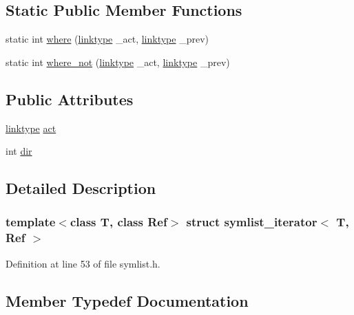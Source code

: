\subsection*{Static Public Member Functions}
\begin{DoxyCompactItemize}
\item 
static int \mbox{\hyperlink{structsymlist__iterator_a260b63ae284e3f07ae510105c7edd6a0}{where}} (\mbox{\hyperlink{structsymlist__iterator_ad9462ba519f8ca01ea64e04e25ee3750}{linktype}} \+\_\+act, \mbox{\hyperlink{structsymlist__iterator_ad9462ba519f8ca01ea64e04e25ee3750}{linktype}} \+\_\+prev)
\item 
static int \mbox{\hyperlink{structsymlist__iterator_abeee238d3bfff557cdbf08a05b632fa8}{where\+\_\+not}} (\mbox{\hyperlink{structsymlist__iterator_ad9462ba519f8ca01ea64e04e25ee3750}{linktype}} \+\_\+act, \mbox{\hyperlink{structsymlist__iterator_ad9462ba519f8ca01ea64e04e25ee3750}{linktype}} \+\_\+prev)
\end{DoxyCompactItemize}
\subsection*{Public Attributes}
\begin{DoxyCompactItemize}
\item 
\mbox{\hyperlink{structsymlist__iterator_ad9462ba519f8ca01ea64e04e25ee3750}{linktype}} \mbox{\hyperlink{structsymlist__iterator_a1c7a0193ab85baa7705070975d841fc8}{act}}
\item 
int \mbox{\hyperlink{structsymlist__iterator_a8433e558ceb6b17b225414ef46b4a3e2}{dir}}
\end{DoxyCompactItemize}


\subsection{Detailed Description}
\subsubsection*{template$<$class T, class Ref$>$\newline
struct symlist\+\_\+iterator$<$ T, Ref $>$}



Definition at line 53 of file symlist.\+h.



\subsection{Member Typedef Documentation}
\mbox{\label{structsymlist__iterator_ad9462ba519f8ca01ea64e04e25ee3750}} 
